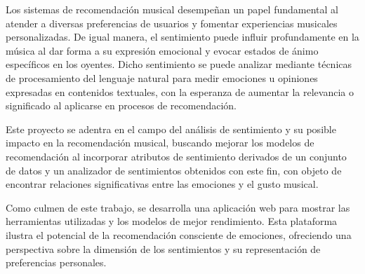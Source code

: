 Los sistemas de recomendación musical desempeñan un papel fundamental al atender a diversas preferencias de usuarios y fomentar experiencias musicales personalizadas. De igual manera, el sentimiento puede influir profundamente en la música al dar forma a su expresión emocional y evocar estados de ánimo específicos en los oyentes. Dicho sentimiento se puede analizar mediante técnicas de procesamiento del lenguaje natural para medir emociones u opiniones expresadas en contenidos textuales, con la esperanza de aumentar la relevancia o significado al aplicarse en procesos de recomendación.

Este proyecto se adentra en el campo del análisis de sentimiento y su posible impacto en la recomendación musical, buscando mejorar los modelos de recomendación al incorporar atributos de sentimiento derivados de un conjunto de datos y un analizador de sentimientos obtenidos con este fin, con objeto de encontrar relaciones significativas entre las emociones y el gusto musical.

Como culmen de este trabajo, se desarrolla una aplicación web para mostrar las herramientas utilizadas y los modelos de mejor rendimiento. Esta plataforma ilustra el potencial de la recomendación consciente de emociones, ofreciendo una perspectiva sobre la dimensión de los sentimientos y su representación de preferencias personales.

